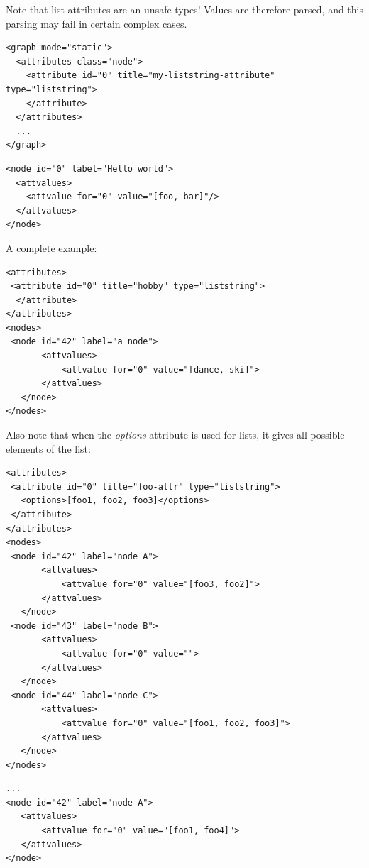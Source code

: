 \documentclass[a4paper,10pt]{article}
\begin{document}
Note that list attributes are an unsafe types! Values are therefore parsed, and this parsing may fail in certain complex cases.

\lstset{ style=gexf }
\begin{lstlisting}[caption={Liststring Definition},label=liststringDef]
<graph mode="static">
  <attributes class="node">
    <attribute id="0" title="my-liststring-attribute" type="liststring">
    </attribute>
  </attributes>
  ...
</graph>
\end{lstlisting}

\lstset{ style=gexf }
\begin{lstlisting}[caption={Liststring usage},label=liststringUse]
<node id="0" label="Hello world">
  <attvalues>
    <attvalue for="0" value="[foo, bar]"/>
  </attvalues>
</node>
\end{lstlisting}

A complete example:

\lstset{ style=gexf }
\begin{lstlisting}[caption={Boolean version},label=boolVersion]
<attributes>
 <attribute id="0" title="hobby" type="liststring">
  </attribute>
</attributes>
<nodes>
 <node id="42" label="a node">
       <attvalues>
           <attvalue for="0" value="[dance, ski]">
       </attvalues>
   </node>
</nodes>
\end{lstlisting}

Also note that when the \textit{options} attribute is used for lists, it gives all possible elements of the list:

\lstset{ style=gexf }
\begin{lstlisting}[caption={Valid values},label=validVal]
<attributes>
 <attribute id="0" title="foo-attr" type="liststring">
   <options>[foo1, foo2, foo3]</options>
 </attribute>
</attributes>
<nodes>
 <node id="42" label="node A">
       <attvalues>
           <attvalue for="0" value="[foo3, foo2]">
       </attvalues>
   </node>
 <node id="43" label="node B">
       <attvalues>
           <attvalue for="0" value="">
       </attvalues>
   </node>
 <node id="44" label="node C">
       <attvalues>
           <attvalue for="0" value="[foo1, foo2, foo3]">
       </attvalues>
   </node>
</nodes>
\end{lstlisting}

\lstset{ style=gexf }
\begin{lstlisting}[caption={Invalid value foo4},label=invalidVal]
...
<node id="42" label="node A">
   <attvalues>
       <attvalue for="0" value="[foo1, foo4]">
   </attvalues>
</node>
\end{lstlisting}
\end{document}
